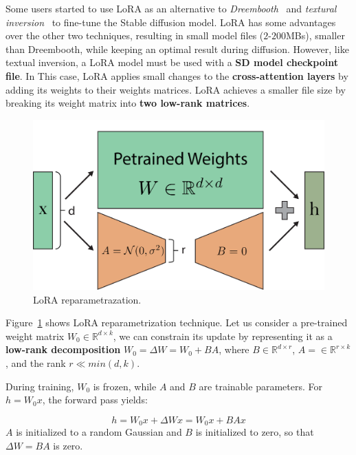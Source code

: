 \documentclass[preprint]{elsarticle}
\begin{document}
Some users started to use LoRA as an alternative to \emph{Dreembooth}~\cite{ruiz2022dreambooth} and \emph{textural inversion}~\cite{gal2022image} to  fine-tune the Stable diffusion model. LoRA has some advantages over the other two techniques, resulting in small model files ($2$-$200$MBs), smaller than Dreembooth,  while keeping an optimal result during diffusion. However, like textual inversion, a LoRA model must be used with a \textbf{SD model checkpoint file}. In This case, LoRA applies small changes to the \textbf{cross-attention layers} by adding its  weights to their weights matrices. LoRA achieves a smaller file size by breaking its weight matrix into \textbf{two low-rank matrices}.


\begin{figure}[t]
	\centering
    \includegraphics[scale=0.62]{img/svg/LoRA.png}
	\caption{LoRA reparametrazation.}\label{fig:lora}
\end{figure}


Figure~\ref{fig:lora} shows LoRA reparametrization technique. Let us consider a  pre-trained weight matrix $W_0 \in \mathbb{R}^{d\times k}$, we can constrain its update by representing it as a \textbf{low-rank decomposition} $W_0 = \Delta W=W_0+BA$, where $B \in \mathbb{R}^{d \times r}$, $A= \in \mathbb{R}^{r \times k}$, and the rank $r \ll min(d,k)$.

During training, $W_0$ is frozen, while $A$ and $B$ are trainable parameters.
For $h = W_0x$, the forward pass yields:

\begin{equation}
	h = W_0x + \Delta Wx = W_0x + BAx
\end{equation}
$A$ is initialized to a random Gaussian and $B$ is initialized to zero, so that
$\Delta W = BA$ is zero.
\end{document}
